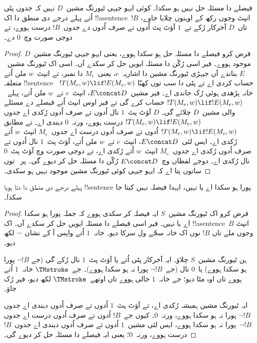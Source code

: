 \documentclass[../../../include/open-logic-section]{subfiles}
\begin{document}

\begin{thm}
فیصلے دا مسئلہ حل نہیں ہو سکدا۔ کوئی ایہو جیہی ٹیورنگ
مشین~$D$ نہیں کہ جدوں پٹی اُتے پہلے درجے دی منطق
دا اک !!a{sentence}~$!B$ انپٹ وجوں رکھ کے اوہنوں
چلایا جاوے، تاں~$D$ آخرکار رُکے تے~$1$ آؤٹ پٹ اُدوں تے صرف
اُدوں دے جدوں~$!B$ درست ہووے، تے دوجی صورت وچ~$0$ دے۔
\end{thm}

\begin{proof}
فرض کرو فیصلے دا مسئلہ حل ہو سکدا ہووے، یعنی
ایہو جیہی ٹیورنگ مشین~$D$ موجود ہووے۔ فیر اسی
رُکّن دا مسئلہ ایویں حل کر سکدے آں۔
اسی اک ٹیورنگ مشین~$E$ بناندے آں جیہڑی
ٹیورنگ مشین دا اشاریہ~$e$، یعنی~$M_e$ دا نمبر، تے انپٹ~$w$
ملن اُتے متعلقہ !!{sentence}~
$!T(M_e, w) \lif !E(M_e, w)$ حساب کردی
اے تے پٹی دا سب توں کھبّا خانہ پڑھدی ہوئی
رُک جاندی اے۔ فیر مشین~$E \concat D$،
انپٹ~$e$ تے~$w$ ملن اُتے، پہلے~
$!T(M_e, w) \lif
!E(M_e, w)$ حساب کرے گی
تے فیر اوس انپٹ اُتے فیصلے دے مسئلے والی
مشین~$D$ چلائے گی۔ $D$ آؤٹ پٹ~$1$ نال
اُدوں تے صرف اُدوں رُکدی اے جدوں
$!T(M_e, w) \lif !E(M_e, w)$ درست ہووے،
ورنہ~$0$ دیندی اے۔
 تے
 مطابق
$!T(M_e, w) \lif !E(M_e, w)$ اُدوں تے صرف اُدوں
درست اے جدوں~$M_e$ انپٹ~$w$ اُتے رُکدی اے۔
ایس لئی~$E\concat D$، انپٹ~$e$ تے~$w$
ملن اُتے، آؤٹ پٹ~$1$ نال اُدوں تے صرف اُدوں رُکدی
اے جدوں~$M_e$ انپٹ~$w$ اُتے رُکدی اے،
تے دوجی صورت وچ آؤٹ پٹ~$0$ نال رُکدی اے۔ دوجے لفظاں
وچ~$E \concat D$ رُکّن دا مسئلہ حل
کر دیوے گی۔ پر~
توں سانوں پتا اے کہ ایہو جیہی کوئی ٹیورنگ مشین
موجود نہیں ہو سکدی۔
\end{proof}

\begin{cor}%
پہلے درجے دی منطق دا دتا ہویا !!{sentence}
پورا ہو سکدا اے یا نہیں، ایہدا فیصلہ نہیں کیتا جا سکدا۔
\end{cor}

\begin{proof}
  فرض کرو اک ٹیورنگ مشین~$S$ ایہ فیصلہ کر
  سکدی ہووے کہ جملہ پورا ہو سکدا اے یا نہیں۔
  فیر اسی فیصلے دا مسئلہ ایویں حل کر سکدے
  آں۔ اک !!a{sentence}~$B$ انپٹ وجوں ملے تاں
  $!B$ نوں اک خانہ سجّے ول سرکا دیو۔
  خانہ~$1$ اُتے واپس آ کے نشان~$\lnot$ لکھ دیو۔

  ہن ٹیورنگ مشین~$S$ چلاؤ۔ ایہ آخرکار پٹی
  اُتے یا آؤٹ پٹ~$1$ نال رُکے گی (جے
  $\lnot !B$ پورا ہو سکدا ہووے) یا~$0$
  نال (جے~$\lnot !B$ پورا نہ ہو سکدا ہووے)۔
  جے~$\TMstroke$ خانہ~$1$ اُتے ہووے تاں
  اوہ مٹا دیو؛ جے خانہ~$1$ خالی ہووے تاں
  اوتھے~$\TMstroke$ لکھ دیو، فیر رُک جاؤ۔

  ایہ ٹیورنگ مشین ہمیشہ رُکدی اے، تے
  آؤٹ پٹ~$1$ اُدوں تے صرف اُدوں دیندی اے جدوں
  $\lnot
  !B$ پورا نہ ہو سکدا ہووے، ورنہ~$0$۔
  کیوں جے~$!B$ اُدوں تے صرف اُدوں درست اے جدوں
  $\lnot !B$~پورا نہ ہو سکدا ہووے،
  ایس لئی مشین~$1$ اُدوں تے صرف اُدوں دیندی اے
  جدوں~$!B$ درست ہووے، ورنہ~$0$؛ یعنی
  ایہ فیصلے دا مسئلہ حل کر دیوے گی۔
\end{proof}
\end{document}
